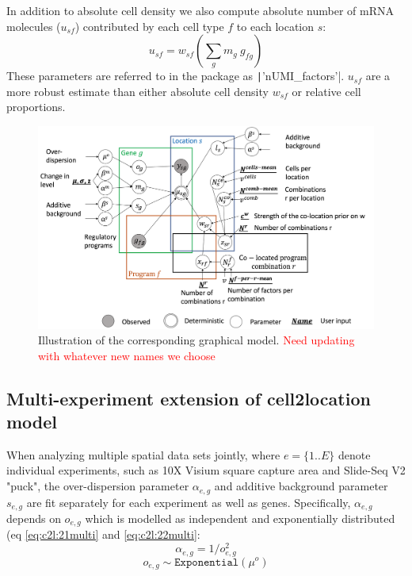 \documentclass[11pt,a4paper]{article}
\newcommand{\red}{\textcolor{red}}
\begin{document}
In addition to absolute cell density we also compute absolute number of mRNA molecules ($u_{sf}$) contributed by each cell type $f$ to each location $s$:
\begin{equation} \label{eq:c2l:24}
u_{sf} = w_{sf} (\sum_{g} {m_{g} \: g_{fg}})
\end{equation}
These parameters are referred to in the package as \texttt|'nUMI_factors'|. $u_{sf}$ are a more robust estimate than either absolute cell density $w_{sf}$ or relative cell proportions. \newline

\begin{figure}
    \includegraphics[scale=0.35]{images/CoLocationModelNB4V2.png}
    \caption{Illustration of the corresponding graphical model. \red{Need updating with whatever new names we choose}}
    \label{fig:graphical_model}
\end{figure}

\subsection{Multi-experiment extension of cell2location model} \label{c2l_multi}

When analyzing multiple spatial data sets jointly, where $e=\{1..E\}$ denote individual experiments, such as 10X Visium square capture area and Slide-Seq V2 "puck", the over-dispersion parameter $\alpha_{e,g}$ and additive background parameter $s_{e,g}$ are fit separately for each experiment as well as genes. Specifically, $\alpha_{e,g}$ depends on $o_{e,g}$ which is modelled as independent and exponentially distributed (eq \ref{eq:c2l:21multi} and \ref{eq:c2l:22multi}:
    \begin{equation} \label{eq:c2l:21multi}
    \alpha_{e,g} = 1 / o_{e,g} ^ 2
    \end{equation}
    \begin{equation} \label{eq:c2l:22multi}
    o_{e,g} \sim \mathtt{Exponential}(\mu^o)
    \end{equation}
\end{document}

